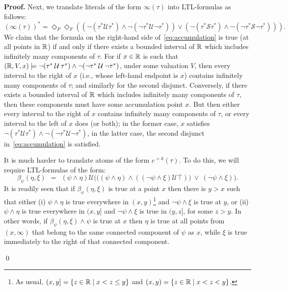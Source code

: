 \documentclass{LMCS}
\renewenvironment{proof}{\par\noindent\textbf{Proof.}}{\mbox{}\qed\par\medskip}
\theoremstyle{plain}
\newcommand{\since}{\mathbin{\mathcal{S}}}
\newcommand{\until}{\mathbin{\mathcal{U}}}
\begin{document}
\begin{proof}
Next, we translate literals of the form $\infty(\tau)$
into LTL-formulas as follows:
\begin{equation}\label{eq:accumulation}
(\infty(\tau))^* = \Diamond_P \Diamond_F
\left(
(\neg (\tau^* \until \tau^*) \wedge \neg (\neg \tau^* \until \neg \tau^*)) \vee
(\neg (\tau^* \since \tau^*) \wedge \neg (\neg \tau^* \since \neg \tau^*))
\right).
\end{equation}
We claim that the formula on the right-hand side
of~\eqref{eq:accumulation} is true (at all points in $\mathbb{R}$) if and only
if there exists a bounded interval of $\mathbb{R}$ which includes infinitely
many components of $\tau$. For if $x \in \mathbb{R}$ is such that $(\R,V,x)
\models \neg (\tau^* \until \tau^*) \wedge \neg (\neg \tau^* \until
\neg \tau^*)$, under some valuation $V$, then every interval to the right of $x$ (i.e., whose
left-hand endpoint is $x$) contains infinitely many components of
$\tau$; and similarly for the second disjunct.  Conversely, if there
exists a bounded interval of $\mathbb{R}$ which includes infinitely many
components of $\tau$, then these components must have some
accumulation point $x$.  But then either every interval to the right
of $x$ contains infinitely many components of $\tau$, or every
interval to the left of $x$ does (or both); in the former case, $x$
satisfies $\neg (\tau^* \until \tau^*) \wedge \neg (\neg \tau^* \until
\neg \tau^*)$, in the latter case, the second disjunct
in~\eqref{eq:accumulation} is satisfied.

It is much harder to translate atoms of the form $c^{=k}(\tau)$.
To do this, we will require LTL-formulas of the form:
\begin{equation*}
\beta_\psi(\eta,\xi) \ \ = \ \ (\psi\land\eta) \until \bigl(\bigl((\psi\land\eta) \land ((\neg \psi \land \xi)\until\top)\bigr)\ \lor\ (\neg\psi\land \xi)\bigr).
\end{equation*}
It is readily seen that if $\beta_\psi(\eta,\xi)$ is true at a point $x$ then there is $y > x$ such that either (i) $\psi\land\eta$ is true everywhere in $(x,y)$\footnote{As usual, $(x,y]=\{z\in \mathbb{R}\mid x < z \leq y\}$ and $(x,y)=\{z \in \mathbb{R} \mid x < z < y\}$.} and $\neg\psi\land\xi$ is true at $y$, or (ii) $\psi\land\eta$ is true everywhere in $(x,y]$ and $\neg\psi\land\xi$ is true in $(y,z]$, for some $z > y$. In other words, if $\beta_\psi(\eta,\xi) \land \psi$ is true at $x$ then $\eta$ is true at all points from $(x,\infty)$ that belong to the same connected component of $\psi$ as $x$, while $\xi$ is true immediately to the right of that connected component.


\end{proof}
\end{document}
